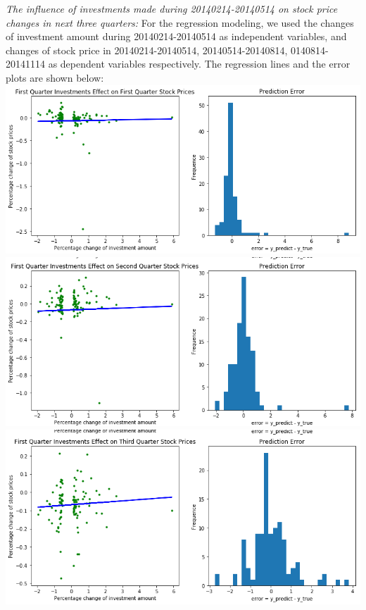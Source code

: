 \documentclass{article}
\begin{document}
\begin{multicols}{2}
\textit{The influence of investments made during 20140214-20140514 on stock price changes in next three quarters:}
For the regression modeling, we used the changes of investment amount during 20140214-20140514 as independent variables, and changes of stock price in 20140214-20140514, 20140514-20140814, 0140814-20141114 as dependent variables respectively. The regression lines and the error plots are shown below:\\ 
\includegraphics[scale=.32]{log1a.png}\\
\includegraphics[scale = 0.32]{log1b.png}\\
\includegraphics[scale = 0.32]{log1c.png}\\


\end{multicols}
\end{document}
